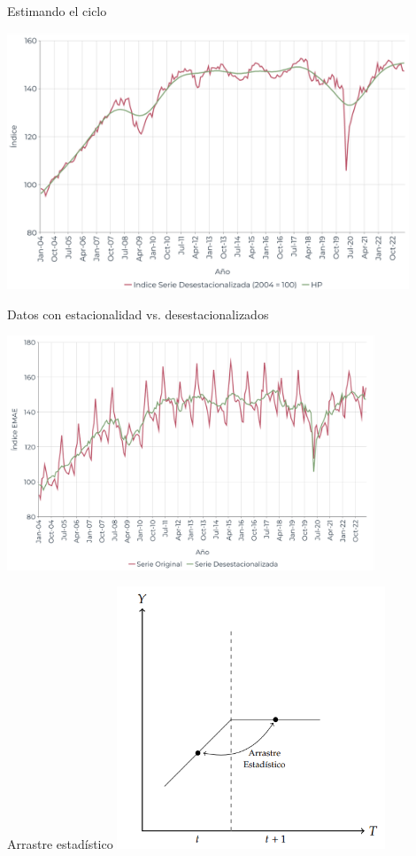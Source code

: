 \documentclass{beamer}
\begin{document}
\begin{frame}{Estimando el ciclo}

    \centering\includegraphics[width=12cm]{../Figures/32.13.png}
    
\end{frame}

\begin{frame}{Datos con estacionalidad vs. desestacionalizados}

\centering\includegraphics[width=11cm]{../Figures/32.14.png}

\end{frame}

\begin{frame}{Arrastre estadístico}
    \centering\includegraphics[width=8cm]{../Figures/C32.16.png}
\end{frame}
\end{document}
